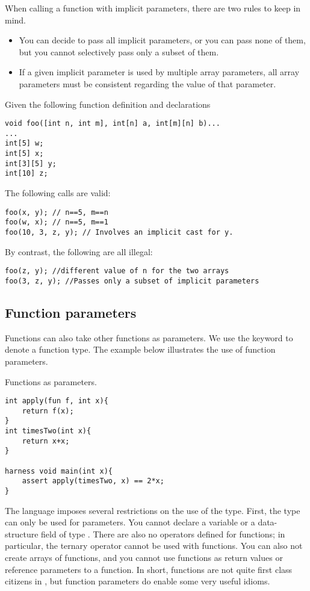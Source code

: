 When calling a function with implicit parameters, there are two rules to keep in mind.
\begin{itemize}
\item You can decide to pass all implicit parameters, or you can pass none of them, but you cannot selectively pass only a subset of them.
\item If a given implicit parameter is used by multiple array parameters, all array parameters must be consistent regarding the value of that parameter.
\end{itemize}

\begin{Example}
Given the following function definition and declarations
\begin{lstlisting}
void foo([int n, int m], int[n] a, int[m][n] b)...
...
int[5] w;
int[5] x;
int[3][5] y;
int[10] z;
\end{lstlisting}
The following calls are valid:
\begin{lstlisting}
foo(x, y); // n==5, m==n
foo(w, x); // n==5, m==1
foo(10, 3, z, y); // Involves an implicit cast for y.
\end{lstlisting}

By contrast, the following are all illegal:
\begin{lstlisting}
foo(z, y); //different value of n for the two arrays
foo(3, z, y); //Passes only a subset of implicit parameters
\end{lstlisting}
\end{Example}



\subsection{Function parameters}
Functions can also take other functions as parameters. We use the keyword  to denote a function type. The example below illustrates the use of function parameters.
\begin{Example}
Functions as parameters.
\begin{lstlisting}
int apply(fun f, int x){
	return f(x);
}
int timesTwo(int x){
	return x+x;
}

harness void main(int x){
	assert apply(timesTwo, x) == 2*x;
}
\end{lstlisting}
\end{Example}

The language imposes several restrictions on the use of the  type. First, the type can only be used for parameters. You cannot declare a variable or a data-structure field of type . There are also no operators defined for functions; in particular, the ternary operator  cannot be used with functions. You can also not create arrays of functions, and you cannot use functions as return values or reference parameters to a function. In short, functions are not quite first class citizens in \Sk{}, but function parameters do enable some very useful idioms.

